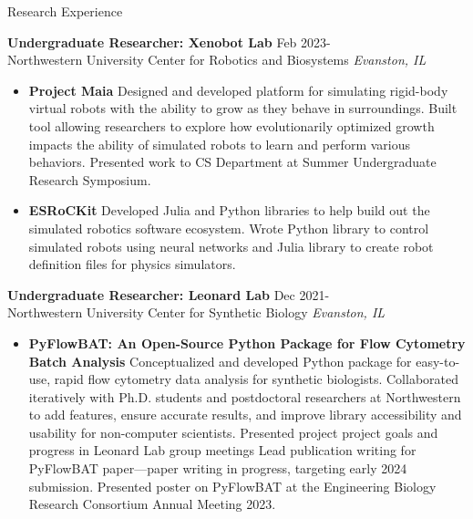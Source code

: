 \documentclass{resume} %
\begin{document}
\begin{rSection}{Research Experience}
    
    \textbf{Undergraduate Researcher: Xenobot Lab} \hfill Feb 2023- \\
     Northwestern University Center for Robotics and Biosystems \hfill \textit{Evanston, IL}
     \begin{itemize}
        \itemsep -3pt {} 
            \item[] \textbf{Project Maia}
            Designed and developed platform for simulating rigid-body virtual robots with the ability to grow as they behave in surroundings.
            Built tool allowing researchers to explore how evolutionarily optimized growth impacts the ability of simulated robots to learn and perform various behaviors.
            Presented work to CS Department at Summer Undergraduate Research Symposium.
            \item[] \textbf{ESRoCKit}
            Developed Julia and Python libraries to help build out the simulated robotics software ecosystem.
            Wrote Python library to control simulated robots using neural networks and Julia library to create robot definition files for physics simulators.
     \end{itemize}
     
     \textbf{Undergraduate Researcher: Leonard Lab} \hfill Dec 2021-\\
     Northwestern University Center for Synthetic Biology \hfill \textit{Evanston, IL}
     \begin{itemize}
        \itemsep -3pt {}
            \item[] \textbf{PyFlowBAT: An Open-Source Python Package for Flow Cytometry Batch Analysis}
            Conceptualized and developed Python package for easy-to-use, rapid flow cytometry data analysis for synthetic biologists.
            Collaborated iteratively with Ph.D. students and postdoctoral researchers at Northwestern to add features, ensure accurate results, and improve library accessibility and usability for non-computer scientists.
            Presented project project goals and progress in Leonard Lab group meetings
            Lead publication writing for PyFlowBAT paper—paper writing in progress, targeting early 2024 submission.
            Presented poster on PyFlowBAT at the Engineering Biology Research Consortium Annual Meeting 2023.
     \end{itemize}



\end{rSection}
\end{document}
